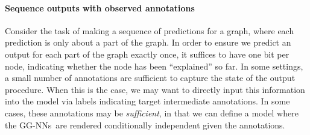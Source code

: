 \documentclass{article} %
\newcommand{\OurMethodMinorShort}{GG-NN}
\newcommand{\OurMethodMinorShorts}{\OurMethodMinorShort s}
\begin{document}
\paragraph{Sequence outputs with observed annotations}

Consider the task of making a sequence of predictions for a graph, where each
prediction is only about a part of the graph. In order to
ensure we predict an output for each part of the graph exactly once, it
suffices to have one bit per node, indicating whether the node has been
``explained'' so far.
In some settings, a small number of annotations are sufficient
to capture the state of the output procedure. When this is the case, we
may want to directly input this information into the model via labels
indicating target intermediate annotations. In some cases, these annotations
may be \emph{sufficient}, in that we can define a model where
the \OurMethodMinorShorts~are rendered
conditionally independent given the annotations.


\end{document}
